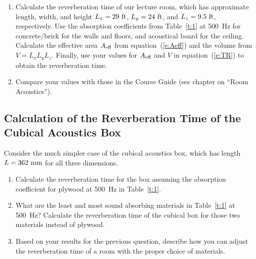 \documentclass[11pt]{NSF}
\def\ben{\begin{enumerate}}
\def\een{\end{enumerate}}
\begin{document}
\ben
\item
Calculate the reverberation time of our lecture room, which has
approximate
length, width, and height $L_x=29~{\rm ft}$, $L_y=24~{\rm ft}$, and 
$L_z=9.5~{\rm ft}$, respectively.
Use the absorption coefficients from Table~\ref{t:1} at 500~Hz
for concrete/brick for the walls and floors, and acoustical board
for the ceiling.
Calculate the effective area $A_{\rm eff}$ from
equation~(\ref{e:Aeff}) and the volume from $V = L_xL_yL_z$. 
Finally, use your values for $A_{\rm eff}$ and $V$ in
equation~(\ref{e:TR}) to
obtain the reverberation time.

\item 
Compare your values with those in the Course Guide (see chapter 
on ``Room Acoustics”).
\een

\subsection{Calculation of the Reverberation Time of the
Cubical Acoustics Box}

Consider the much simpler case of the cubical acoustics box, 
which has length $L=362~{\rm mm}$ for all three dimensions.

\ben
\item 
Calculate the reverberation time for the box 
assuming the absorption coefficient for plywood at 500~Hz 
in Table~\ref{t:1}.

\item 
What are the least and most sound absorbing materials in 
Table~\ref{t:1} at 500~Hz?
Calculate the reverberation time of the cubical box for 
those two materials instead of plywood.

\item
Based on your results for the previous question, describe how you
can adjust the reverberation time of a room with the proper choice
of materials.

\een
\end{document}
